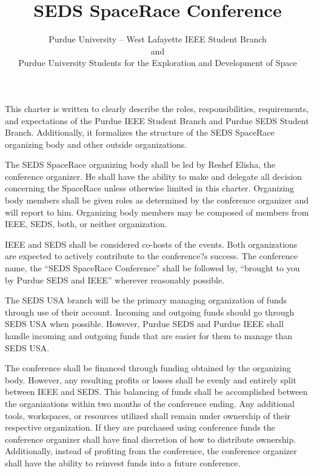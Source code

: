 \documentclass[12pt]{constitution}
\title{SEDS SpaceRace Conference}
\author{Purdue University -- West Lafayette IEEE Student Branch \\ and \\ Purdue University Students for the Exploration and Development of Space}
\date{}
\begin{document}

\titlecontentspage
\newpage


\label{art:preamble}

This charter is written to clearly describe the roles, responsibilities, requirements, and expectations of the Purdue IEEE Student Branch and Purdue SEDS Student Branch. Additionally, it formalizes the structure of the SEDS SpaceRace organizing body and other outside organizations.


\label{art:organize}

The SEDS SpaceRace organizing body shall be led by Reshef Elisha, the conference organizer. He shall have the ability to make and delegate all decision concerning the SpaceRace unless otherwise limited in this charter. Organizing body members shall be given roles as determined by the conference organizer and will report to him. Organizing body members may be composed of members from IEEE, SEDS, both, or neither organization.

IEEE and SEDS shall be considered co-hosts of the events. Both organizations are expected to actively contribute to the conference?s success. The conference name, the ``SEDS SpaceRace Conference'' shall be followed by, ``brought to you by Purdue SEDS and IEEE'' wherever reasonably possible.


\label{art:finance}

The SEDS USA branch will be the primary managing organization of funds through use of their account. Incoming and outgoing funds should go through SEDS USA when possible. However, Purdue SEDS and Purdue IEEE shall handle incoming and outgoing funds that are easier for them to manage than SEDS USA.

The conference shall be financed through funding obtained by the organizing body. However, any resulting profits or losses shall be evenly and entirely split between IEEE and SEDS. This balancing of funds shall be accomplished between the organizations within two months of the conference ending. Any additional tools, workspaces, or resources utilized shall remain under ownership of their respective organization. If they are purchased using conference funds the conference organizer shall have final discretion of how to distribute ownership. Additionally, instead of profiting from the conference, the conference organizer shall have the ability to reinvest funds into a future conference.
\end{document}
